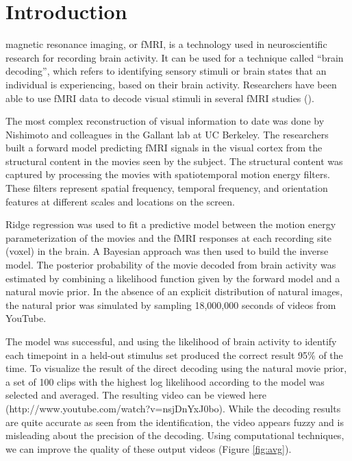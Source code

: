 
\section{Introduction}
 magnetic resonance imaging, or fMRI, is a technology used in neuroscientific research for recording brain activity. It can be used for a technique called ``brain decoding'', which refers to identifying sensory stimuli or brain states that an individual is experiencing, based on their brain activity. Researchers have been able to use fMRI data to decode visual stimuli in several fMRI studies (\cite{Kamitani, Naselaris, Nishimoto}).

The most complex reconstruction of visual information to date was done by Nishimoto and colleagues in the Gallant lab at UC Berkeley. The researchers built a forward model predicting fMRI signals in the visual cortex from the structural content in the movies seen by the subject. The structural content was captured by processing the movies with spatiotemporal motion energy filters. These filters represent spatial frequency, temporal frequency, and orientation features at different scales and locations on the screen. 

Ridge regression was used to fit a predictive model between the motion energy parameterization of the movies and the fMRI responses at each recording site (voxel) in the brain. A Bayesian approach was then used to build the inverse model. The posterior probability of the movie decoded from brain activity was estimated by combining a likelihood function given by the forward model and a natural movie prior. In the absence of an explicit distribution of natural images, the natural prior was simulated by sampling 18,000,000 seconds of videos from YouTube.

The model was successful, and using the likelihood of brain activity to identify each timepoint in a held-out stimulus set produced the correct result 95\% of the time. To visualize the result of the direct decoding using the natural movie prior, a set of 100 clips with the highest log likelihood according to the model was selected and averaged. The resulting video can be viewed here (http://www.youtube.com/watch?v=nsjDnYxJ0bo). While the decoding results are quite accurate as seen from the identification, the video appears fuzzy and is misleading about the precision of the decoding. Using computational techniques, we can improve the quality of these output videos (Figure \ref{fig:avg}).


